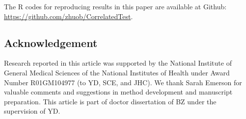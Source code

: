 The R codes for reproducing results in this paper are available at Github: 
\url{https://github.com/zhuob/CorrelatedTest}.


\subsection*{Acknowledgement}
Research reported in this article was supported by the National Institute of General Medical 
Sciences of the National Institutes of Health under Award Number R01GM104977 (to YD, SCE, and JHC). 
We thank Sarah Emerson for valuable comments and suggestions in method development and 
manuscript preparation. This article is part of doctor dissertation of BZ under the supervision 
of YD.





\newpage

